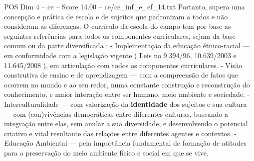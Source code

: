 \begin{textsample}{POS Dim 4 – ce – Score 14.00 – ce/ce\_inf\_e\_ef\_14.txt}
Portanto, supera uma concepção e prática de escola e de sujeitos que padronizam a todos e não consideram as diferenças.
O currículo da escola do campo tem por base as seguintes referências para todos os componentes curriculares, sejam da base comum ou da parte diversificada : - Implementação da educação étnico-racial — em conformidade com a legislação vigente ( Leis no 9.394/96, 10.639/2003 e 11.645/2008 ), em articulação com todos os componentes curriculares. - Visão construtiva de ensino e de aprendizagem — com a compreensão de fatos que ocorrem no mundo e ao seu redor, numa constante construção e reconstrução do conhecimento, e maior interação entre ser humano, meio ambiente e sociedade. - Interculturalidade — com valorização da \textbf{identidade} dos sujeitos e sua cultura — com (con)vivências democráticas entre diferentes culturas, buscando a integração entre elas, sem anular a sua diversidade, e desenvolvendo o potencial criativo e vital resultante das relações entre diferentes agentes e contextos. - Educação Ambiental — pela importância fundamental de formação de atitudes para a preservação do meio ambiente físico e social em que se vive.

\end{textsample}
